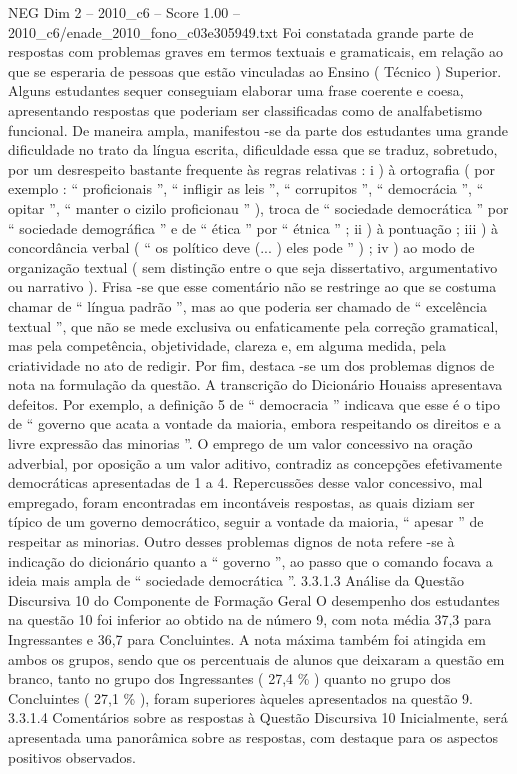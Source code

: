 \begin{textsample}{NEG Dim 2 – 2010\_c6 – Score 1.00 – 2010\_c6/enade\_2010\_fono\_c03e305949.txt}
Foi constatada grande parte de respostas com problemas graves em termos textuais e gramaticais, em relação ao que se esperaria de pessoas que estão vinculadas ao Ensino ( Técnico ) Superior.
Alguns estudantes sequer conseguiam elaborar uma frase coerente e coesa, apresentando respostas que poderiam ser classificadas como de analfabetismo funcional.
De maneira ampla, manifestou -se da parte dos estudantes uma grande dificuldade no trato da língua escrita, dificuldade essa que se traduz, sobretudo, por um desrespeito bastante frequente às regras relativas : i ) à ortografia ( por exemplo : “ proficionais ”, “ infligir as leis ”, “ corrupitos ”, “ democrácia ”, “ opitar ”, “ manter o cizilo proficionau ” ), troca de “ sociedade democrática ” por “ sociedade demográfica ” e de “ ética ” por “ étnica ” ; ii ) à pontuação ; iii ) à concordância verbal ( “ os político deve (... ) eles pode ” ) ; iv ) ao modo de organização textual ( sem distinção entre o que seja dissertativo, argumentativo ou narrativo ).
Frisa -se que esse comentário não se restringe ao que se costuma chamar de “ língua padrão ”, mas ao que poderia ser chamado de “ excelência textual ”, que não se mede exclusiva ou enfaticamente pela correção gramatical, mas pela competência, objetividade, clareza e, em alguma medida, pela criatividade no ato de redigir.
Por fim, destaca -se um dos problemas dignos de nota na formulação da questão.
A transcrição do Dicionário Houaiss apresentava defeitos.
Por exemplo, a definição 5 de “ democracia ” indicava que esse é o tipo de “ governo que acata a vontade da maioria, embora respeitando os direitos e a livre expressão das minorias ”.
O emprego de um valor concessivo na oração adverbial, por oposição a um valor aditivo, contradiz as concepções efetivamente democráticas apresentadas de 1 a 4.
Repercussões desse valor concessivo, mal empregado, foram encontradas em incontáveis respostas, as quais diziam ser típico de um governo democrático, seguir a vontade da maioria, “ apesar ” de respeitar as minorias.
Outro desses problemas dignos de nota refere -se à indicação do dicionário quanto a “ governo ”, ao passo que o comando focava a ideia mais ampla de “ sociedade democrática ”. 3.3.1.3 Análise da Questão Discursiva 10 do Componente de Formação Geral O desempenho dos estudantes na questão 10 foi inferior ao obtido na de número 9, com nota média 37,3 para Ingressantes e 36,7 para Concluintes.
A nota máxima também foi atingida em ambos os grupos, sendo que os percentuais de alunos que deixaram a questão em branco, tanto no grupo dos Ingressantes ( 27,4 \% ) quanto no grupo dos Concluintes ( 27,1 \% ), foram superiores àqueles apresentados na questão 9. 3.3.1.4 Comentários sobre as respostas à Questão Discursiva 10 Inicialmente, será apresentada uma panorâmica sobre as respostas, com destaque para os aspectos positivos observados.

\end{textsample}
